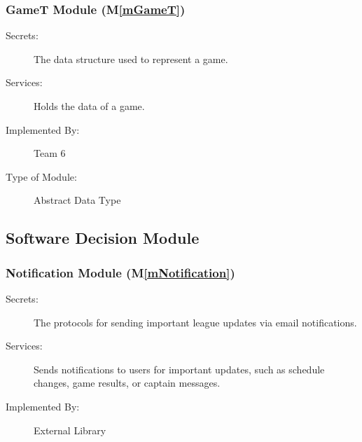 \documentclass[12pt, titlepage]{article}
\newcommand{\mref}[1]{M\ref{#1}}
\begin{document}
  \subsubsection{GameT Module (\mref{mGameT})}

  \begin{description}
    \item[Secrets:] The data structure used to represent a game.
    \item[Services:] Holds the data of a game.
    \item[Implemented By:] Team 6
    \item[Type of Module:] Abstract Data Type
  \end{description}

\subsection{Software Decision Module}


\subsubsection{Notification Module (\mref{mNotification})}
\begin{description}
  \item[Secrets:] The protocols for sending important league updates via email notifications.
  \item[Services:] Sends notifications to users for important updates, such as schedule changes, game results, or captain messages.
  \item[Implemented By:] External Library
\end{description}
\end{document}
